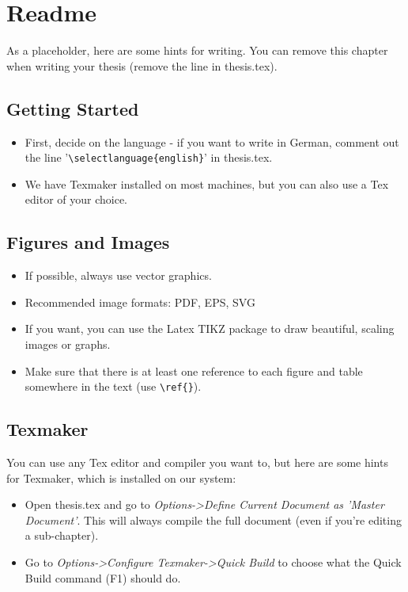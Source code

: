 \chapter{Readme}

As a placeholder, here are some hints for writing.
You can remove this chapter when writing your thesis (remove the line \verb|| in thesis.tex).

\section{Getting Started}
\begin{itemize}
\item First, decide on the language - if you want to write in German, comment out the line '\verb|\selectlanguage{english}|' in thesis.tex.
\item We have Texmaker installed on most machines, but you can also use a Tex editor of your choice.
\end{itemize}

\section{Figures and Images}
\begin{itemize}
\item If possible, always use vector graphics.
\item Recommended image formats: PDF, EPS, SVG
\item If you want, you can use the Latex TIKZ package to draw beautiful, scaling images or graphs.
\item Make sure that there is at least one reference to each figure and table somewhere in the text (use \verb|\ref{}|).
\end{itemize}

\section{Texmaker}
You can use any Tex editor and compiler you want to, but here are some hints for Texmaker, which is installed on our system:
\begin{itemize}
\item Open thesis.tex and go to \emph{Options->Define Current Document as 'Master Document'}. This will always compile the full document (even if you're editing a sub-chapter).
\item Go to \emph{Options->Configure Texmaker->Quick Build} to choose what the Quick Build command (F1) should do.
\end{itemize}

